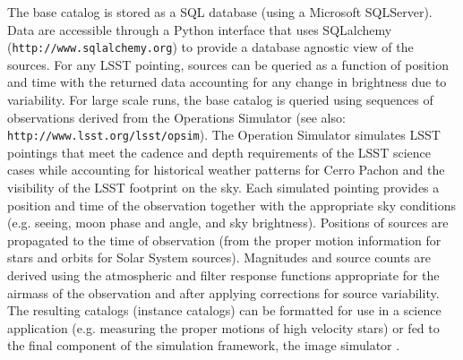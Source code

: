 \documentclass[]{article}
\begin{document}
{The base catalog is stored as a SQL database (using a Microsoft
SQLServer). Data are accessible through a Python interface that uses
SQLalchemy ({\tt http://www.sqlalchemy.org}) to provide a database 
agnostic view of the sources. For any
LSST pointing, sources can be queried as a function of position and
time with the returned data accounting for any change in brightness
due to variability. For large scale runs, the base catalog is queried
using sequences of observations derived from the Operations Simulator
\citep{cook09} (see also: {\tt http://www.lsst.org/lsst/opsim}). 
The Operation Simulator simulates LSST pointings that
meet the cadence and depth requirements of the LSST science cases
while accounting for historical weather patterns for Cerro Pachon and
the visibility of the LSST footprint on the sky. Each simulated
pointing provides a position and time of the observation together with
the appropriate sky conditions (e.g. seeing, moon phase and angle, and
sky brightness). Positions of sources are propagated to the time of
observation (from the proper motion information for stars and orbits
for Solar System sources). Magnitudes and source counts are derived
using the atmospheric and filter response functions appropriate for
the airmass of the observation and after applying corrections for
source variability. The resulting catalogs (instance catalogs) can be
formatted for use in a science application (e.g. measuring the proper
motions of high velocity stars) or fed to the final component of the
simulation framework, the image simulator \citep{phosim}. 
\begin{figure}[H]

\end{figure}}
\end{document}
